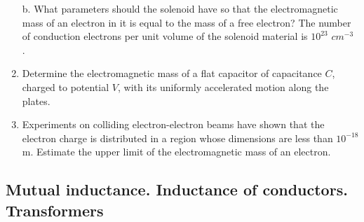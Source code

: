 \documentclass{article}
\begin{document}
\begin{enumerate}[label=11.2.\arabic*]
b. What parameters should the solenoid have so that the electromagnetic mass of an electron in it is equal to the mass of a free electron? The number of conduction electrons per unit volume of the solenoid material is $10^{23}$ $cm^{-3}$ .

\item Determine the electromagnetic mass of a flat capacitor of capacitance $C$, charged to potential $V$, with its uniformly accelerated motion along the plates.

\item Experiments on colliding electron-electron beams have shown that the electron charge is distributed in a region whose dimensions are less than $10^{-18}$ m. Estimate the upper limit of the electromagnetic mass of an electron.



\end{enumerate}


\subsection{Mutual inductance. Inductance of conductors. Transformers}
\end{document}
